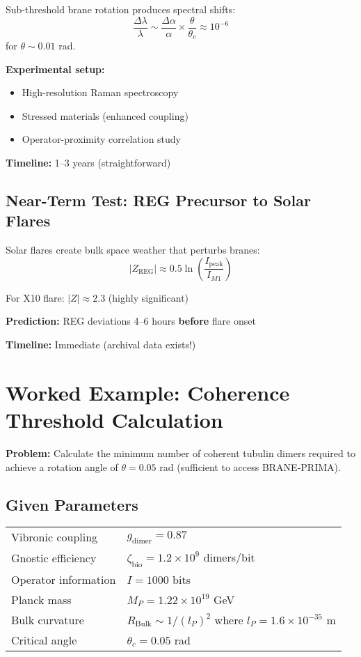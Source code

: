 Sub-threshold brane rotation produces spectral shifts:
\begin{equation}
\frac{\Delta\lambda}{\lambda} \sim \frac{\Delta\alpha}{\alpha} \times \frac{\theta}{\theta_c} \approx 10^{-6}
\end{equation}
for $\theta \sim 0.01$ rad.

\textbf{Experimental setup:}
\begin{itemize}
\item High-resolution Raman spectroscopy
\item Stressed materials (enhanced coupling)
\item Operator-proximity correlation study
\end{itemize}

\textbf{Timeline:} 1--3 years (straightforward)

\subsection{Near-Term Test: REG Precursor to Solar Flares}

Solar flares create bulk space weather that perturbs branes:
\begin{equation}
|Z_{\text{REG}}| \approx 0.5\ln\left(\frac{I_{\text{peak}}}{I_{M1}}\right)
\end{equation}

For X10 flare: $|Z| \approx 2.3$ (highly significant)

\textbf{Prediction:} REG deviations 4--6 hours \textbf{before} flare onset

\textbf{Timeline:} Immediate (archival data exists!)

\section{Worked Example: Coherence Threshold Calculation}

\textbf{Problem:} Calculate the minimum number of coherent tubulin dimers required to achieve a rotation angle of $\theta = 0.05$ rad (sufficient to access BRANE-PRIMA).

\subsection*{Given Parameters}

\begin{tabular}{@{}ll@{}}
Vibronic coupling & $g_{\text{dimer}} = 0.87$ \\
Gnostic efficiency & $\zeta_{\text{bio}} = 1.2 \times 10^9$ dimers/bit \\
Operator information & $I = 1000$ bits \\
Planck mass & $M_P = 1.22 \times 10^{19}$ GeV \\
Bulk curvature & $R_{\text{Bulk}} \sim 1/(l_P)^2$ where $l_P = 1.6 \times 10^{-35}$ m \\
Critical angle & $\theta_c = 0.05$ rad \\
\end{tabular}

